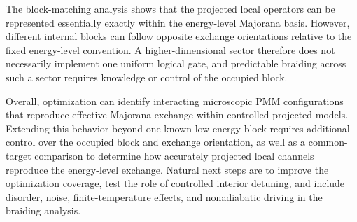 The block-matching analysis shows that the projected local operators can be represented essentially exactly within the energy-level Majorana basis. However, different internal blocks can follow opposite exchange orientations relative to the fixed energy-level convention. A higher-dimensional sector therefore does not necessarily implement one uniform logical gate, and predictable braiding across such a sector requires knowledge or control of the occupied block.

Overall, optimization can identify interacting microscopic PMM configurations that reproduce effective Majorana exchange within controlled projected models. Extending this behavior beyond one known low-energy block requires additional control over the occupied block and exchange orientation, as well as a common-target comparison to determine how accurately projected local channels reproduce the energy-level exchange. Natural next steps are to improve the optimization coverage, test the role of controlled interior detuning, and include disorder, noise, finite-temperature effects, and nonadiabatic driving in the braiding analysis.
